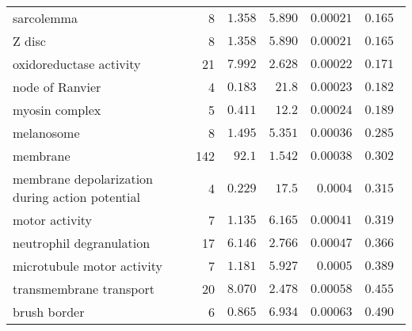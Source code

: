 \begin{longtable}{|l|r|r|r|r|r|}
                                        sarcolemma &                       8 &                $ 1.358$ &   $ 5.890$ &            $0.00021$ &                     $ 0.165~~$ \\
                                            Z disc &                       8 &                $ 1.358$ &   $ 5.890$ &            $0.00021$ &                     $ 0.165~~$ \\
                           oxidoreductase activity &                      21 &                $ 7.992$ &   $ 2.628$ &            $0.00022$ &                     $ 0.171~~$ \\
                                   node of Ranvier &                       4 &                $ 0.183$ &   $  21.8$ &            $0.00023$ &                     $ 0.182~~$ \\
                                    myosin complex &                       5 &                $ 0.411$ &   $  12.2$ &            $0.00024$ &                     $ 0.189~~$ \\
                                        melanosome &                       8 &                $ 1.495$ &   $ 5.351$ &            $0.00036$ &                     $ 0.285~~$ \\
                                          membrane &                     142 &                $  92.1$ &   $ 1.542$ &            $0.00038$ &                     $ 0.302~~$ \\
   membrane depolarization during action potential &                       4 &                $ 0.229$ &   $  17.5$ &             $0.0004$ &                     $ 0.315~~$ \\
                                    motor activity &                       7 &                $ 1.135$ &   $ 6.165$ &            $0.00041$ &                     $ 0.319~~$ \\
                          neutrophil degranulation &                      17 &                $ 6.146$ &   $ 2.766$ &            $0.00047$ &                     $ 0.366~~$ \\
                        microtubule motor activity &                       7 &                $ 1.181$ &   $ 5.927$ &             $0.0005$ &                     $ 0.389~~$ \\
                           transmembrane transport &                      20 &                $ 8.070$ &   $ 2.478$ &            $0.00058$ &                     $ 0.455~~$ \\
                                      brush border &                       6 &                $ 0.865$ &   $ 6.934$ &            $0.00063$ &                     $ 0.490~~$ \\

\end{longtable}

